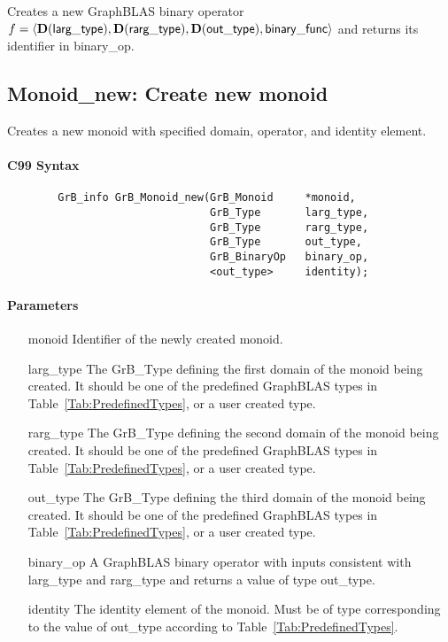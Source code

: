 Creates a new GraphBLAS binary operator $f = \langle \bold{D}({\sf larg\_type}), 
\bold{D}({\sf rarg\_type}), \bold{D}({\sf out\_type}), {\sf binary\_func} \rangle$ and returns its identifier in {\sf binary\_op}.




\subsection{{\sf Monoid\_new}: Create new monoid}

Creates a new monoid with specified domain, operator, and identity element.

\paragraph{C99 Syntax}

\begin{verbatim}
        GrB_info GrB_Monoid_new(GrB_Monoid     *monoid,
                                GrB_Type       larg_type,
                                GrB_Type       rarg_type,
                                GrB_Type       out_type,
                                GrB_BinaryOp   binary_op,
                                <out_type>     identity);
\end{verbatim}

\paragraph{Parameters}

\begin{itemize}[leftmargin=1.1in]
    \item[{\sf monoid}]         Identifier of the newly created monoid.
    \item[{\sf larg\_type}]     The {\sf GrB\_Type} defining the first domain of the monoid 
    being created. It should be one of the predefined GraphBLAS types in
    Table~\ref{Tab:PredefinedTypes}, or a user created type.
    \item[{\sf rarg\_type}]     The {\sf GrB\_Type} defining the second domain of the monoid
    being created.  It should be one of the predefined GraphBLAS types in
    Table~\ref{Tab:PredefinedTypes}, or a user created type.
    \item[{\sf out\_type}]      The {\sf GrB\_Type} defining the third domain of the monoid 
    being created.  It should be one of the predefined GraphBLAS types in
    Table~\ref{Tab:PredefinedTypes}, or a user created type.
    \item[{\sf binary\_op}]     A GraphBLAS binary operator with inputs consistent
    with {\sf larg\_type} and {\sf rarg\_type} and returns a value of type {\sf out\_type}.
    \item[{\sf identity}]       The identity element of the monoid. 
    Must be of type corresponding to the value of {\sf out\_type} according to
    Table~\ref{Tab:PredefinedTypes}.
\end{itemize}

